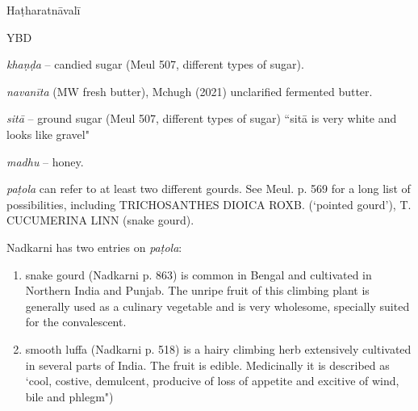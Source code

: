 \begin{ekdosis}
\begin{testimonia}[hp01_062]
Haṭharatnāvalī

\begin{versinnote}
\end{versinnote}

YBD

\begin{versinnote}
\end{versinnote}

\end{testimonia}

\begin{philcomm}[hp01_062]
\emph{khaṇḍa} -- candied sugar (Meul 507, different types of sugar).

\emph{navanīta} (MW fresh butter), Mchugh (2021) unclarified fermented butter.

\emph{sitā} -- ground sugar (Meul 507, different types of sugar) ``sitā is very white and looks like gravel"

\emph{madhu} -- honey.

\emph{paṭola} can refer to at least two different gourds. See Meul. p. 569 for a long list of possibilities, including TRICHOSANTHES DIOICA ROXB. (`pointed gourd'), T. CUCUMERINA LINN (snake gourd).

Nadkarni has two entries on \emph{paṭola}:
\begin{enumerate}
\item snake gourd (Nadkarni p. 863) is common in Bengal and cultivated in Northern India and Punjab. The unripe fruit of this climbing plant is generally used as a culinary vegetable and is very wholesome, specially suited for the convalescent.

\item smooth luffa (Nadkarni p. 518) is a hairy climbing herb extensively cultivated in several parts of India. The fruit is edible. Medicinally it is described as `cool, costive, demulcent, producive of loss of appetite and excitive of wind, bile and phlegm")
\end{enumerate}


\end{philcomm}
\end{ekdosis}
